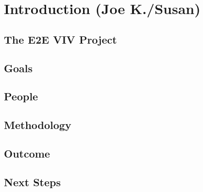 \chapter{Introduction (Joe K./Susan)}
\section{The E2E VIV Project}
\section{Goals}
\section{People}
\section{Methodology}
\section{Outcome}
\section{Next Steps}
